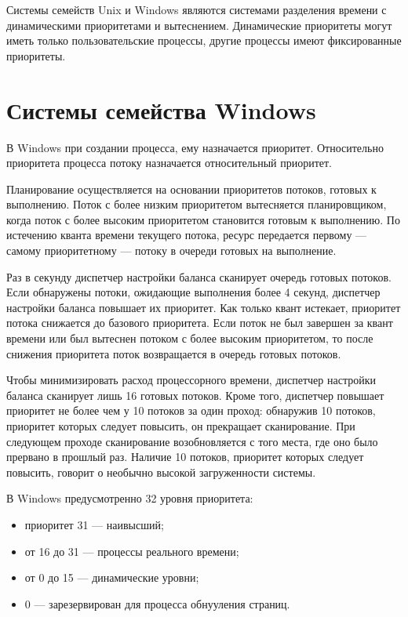 Системы семейств Unix и Windows являются системами разделения времени с динамическими приоритетами и вытеснением. Динамические приоритеты могут иметь только пользовательские процессы, другие процессы имеют фиксированные приоритеты.

\section*{Системы семейства Windows}

В Windows при создании процесса, ему назначается приоритет. Относительно приоритета процесса потоку назначается относительный приоритет.

Планирование осуществляется на основании приоритетов потоков, готовых к выполнению. Поток с более низким приоритетом вытесняется планировщиком, когда поток с более высоким приоритетом становится готовым к выполнению. По истечению кванта времени текущего потока, ресурс передается первому --- самому приоритетному --- потоку в очереди готовых на выполнение.

Раз в секунду диспетчер настройки баланса сканирует очередь готовых потоков. Если обнаружены потоки, ожидающие выполнения более 4 секунд, диспетчер настройки баланса повышает их приоритет. Как только квант истекает, приоритет потока снижается до базового приоритета. Если поток не был завершен за квант времени или был вытеснен потоком с более высоким приоритетом, то после снижения приоритета поток возвращается в очередь готовых потоков.

Чтобы минимизировать расход процессорного времени, диспетчер настройки баланса сканирует лишь 16 готовых потоков. Кроме того, диспетчер повышает приоритет не более чем у 10 потоков за один проход: обнаружив 10 потоков, приоритет которых следует повысить, он прекращает сканирование. При следующем проходе сканирование возобновляется с того места, где оно было прервано в прошлый раз. Наличие 10 потоков, приоритет которых следует повысить, говорит о необычно высокой загруженности системы.

В Windows предусмотренно 32 уровня приоритета:
\begin{itemize}
	\item приоритет 31 --- наивысший;
	
	\item от 16 до 31 --- процессы реального времени;
	
	\item от 0 до 15 --- динамические уровни;
	
	\item 0 --- зарезервирован для процесса обнууления страниц.
	
\end{itemize}

